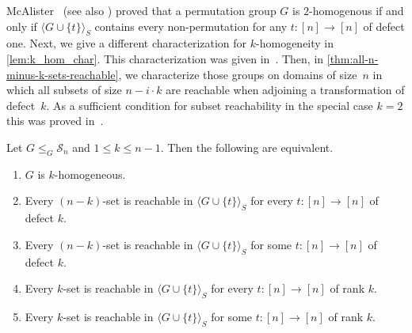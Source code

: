 McAlister~\cite{mcalister1998semigroups} (see also \cite[Thm. 8.2]{ArCamSt2017})
proved that a permutation group $G$
is $2$-homogenous if and only 
if $\langle G \cup \{t\}\rangle_S$
contains every non-permutation
for any $t \colon [n]\to [n]$ of defect one.
Next, we give a different characterization for $k$-homogeneity in \cref{lem:k_hom_char}.
This characterization was given in~\cite[Lem.~4.1]{HoffmannLATAextended2}.
Then, in \cref{thm:all-n-minus-k-sets-reachable}, 
we characterize those groups on domains of size~$n$
in which all subsets of size $n - i\cdot k$ are reachable
when adjoining a transformation of defect~$k$.
As a sufficient condition for subset reachability in the special case $k = 2$
this was proved in~\cite[Prop.~4.2]{HoffmannLATAextended2}.

\begin{proposition} \label{lem:k_hom_char}
	Let $G \le_G \mathcal S_n$ and $1 \le k \le n - 1$. Then the following are equivalent.
	\begin{enumerate}
		\item \label{cond:hom} $G$ is $k$-homogeneous.
		
		\item \label{cond:any_f} Every $(n-k)$-set is reachable in $\langle G \cup \{t\} \rangle_S$ for every $t \colon [n] \to [n]$ of defect $k$.
		
		\item \label{cond:some_f} Every $(n-k)$-set	is reachable in $\langle G \cup \{t\} \rangle_S$ for some $t \colon [n] \to [n]$ of defect $k$.
		
		\item \label{cond:any_f_k} Every $k$-set is reachable in $\langle G \cup \{t\} \rangle_S$ for every $t \colon [n] \to [n]$ of rank $k$.
		
		\item \label{cond:some_f_k} Every $k$-set is reachable in $\langle G \cup \{t\} \rangle_S$ for some $t \colon [n] \to [n]$ of rank $k$.
	\end{enumerate}		
\end{proposition}
